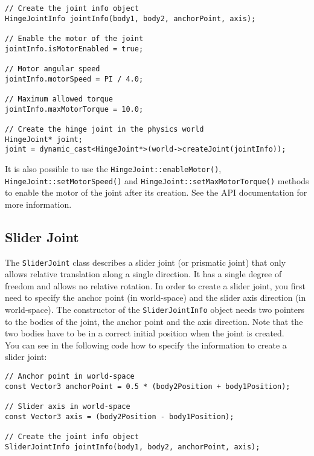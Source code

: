 \documentclass[a4paper,12pt]{article}
\begin{document}
     \begin{lstlisting}
// Create the joint info object
HingeJointInfo jointInfo(body1, body2, anchorPoint, axis);

// Enable the motor of the joint
jointInfo.isMotorEnabled = true;

// Motor angular speed
jointInfo.motorSpeed = PI / 4.0;

// Maximum allowed torque
jointInfo.maxMotorTorque = 10.0;

// Create the hinge joint in the physics world
HingeJoint* joint;
joint = dynamic_cast<HingeJoint*>(world->createJoint(jointInfo));
  \end{lstlisting}

     \vspace{0.6cm}

     \begin{sloppypar}
        It is also possible to use the \texttt{HingeJoint::enableMotor()}, \texttt{HingeJoint::setMotorSpeed()} and
	     \texttt{HingeJoint::setMaxMotorTorque()} methods to
        enable the motor of the joint after its creation. See the API documentation for more information.
     \end{sloppypar}

    \subsection{Slider Joint}

    The \texttt{SliderJoint} class describes a slider joint (or prismatic joint) that only allows relative translation along a single direction. It has a single degree of freedom and allows no
    relative rotation. In order to create a slider joint, you first need to specify the anchor point (in world-space) and the slider axis direction (in world-space). The constructor of the
    \texttt{SliderJointInfo} object needs two pointers to the bodies of the joint, the anchor point and the axis direction. Note that the two bodies have to be in a correct initial position when
    the joint is created. \\

    You can see in the following code how to specify the information to create a slider joint: \\

    \begin{lstlisting}
// Anchor point in world-space
const Vector3 anchorPoint = 0.5 * (body2Position + body1Position);

// Slider axis in world-space
const Vector3 axis = (body2Position - body1Position);

// Create the joint info object
SliderJointInfo jointInfo(body1, body2, anchorPoint, axis);
  \end{lstlisting}
\end{document}
